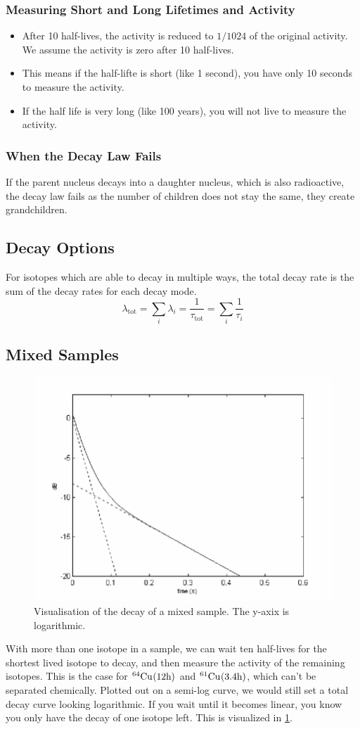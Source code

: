 \subsubsection{Measuring Short and Long Lifetimes and Activity}
\begin{itemize}
    \item After 10 half-lives, the activity is reduced to $1/1024$ of the original activity. We assume the activity is zero after 10 half-lives. 
    \item This means if the half-lifte is short (like 1 second), you have only 10 seconds to measure the activity.
    \item If the half life is very long (like 100 years), you will not live to measure the activity.
\end{itemize}

\subsubsection{When the Decay Law Fails}
If the parent nucleus decays into a daughter nucleus, which is also radioactive, the decay law fails as the number of children does not stay the same, they create grandchildren. 

\subsection{Decay Options}  
For isotopes which are able to decay in multiple ways, the total decay rate is the sum of the decay rates for each decay mode.
\begin{equation}
  λ_\text{tot} = ∑_{i}^{} λ_i = \frac{1}{τ_\text{tot}} = ∑_{i}^{} \frac{1}{τ_i}
\end{equation}

\subsection{Mixed Samples}
\begin{figure}
\vspace{-6.5mm}
\centering
\includegraphics[width = .35\textwidth]{mixed_sample_decay.png}
\caption{Visualisation of the decay of a mixed sample. The y-axix is logarithmic.}
\label{fig: mixed_sample_decay}
\end{figure}
With more than one isotope in a sample, we can wait ten half-lives for the shortest lived isotope to decay, and then measure the activity of the remaining isotopes. This is the case for $\ce{}^{64}\text{Cu}_{}(12\text{h})$ and $\ce{}^{61}\text{Cu}_{}(3.4\text{h})$, which can't be separated chemically. Plotted out on a semi-log curve, we would still set a total decay curve looking logarithmic. If you wait until it becomes linear, you know you only have the decay of one isotope left. This is visualized in \cref{fig: mixed_sample_decay}.

